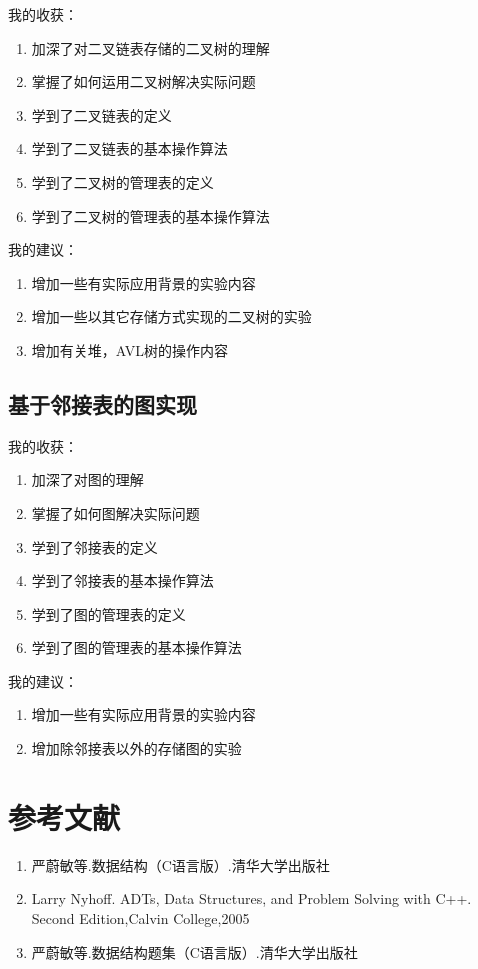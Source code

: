 \documentclass[supercite]{Experimental_Report}
\theoremstyle{definition}
\begin{document}
我的收获：
\begin{enumerate}
	\item 加深了对二叉链表存储的二叉树的理解
    \item 掌握了如何运用二叉树解决实际问题
    \item 学到了二叉链表的定义
    \item 学到了二叉链表的基本操作算法
    \item 学到了二叉树的管理表的定义
    \item 学到了二叉树的管理表的基本操作算法
\end{enumerate}
我的建议：
\begin{enumerate}
	\item 增加一些有实际应用背景的实验内容
    \item 增加一些以其它存储方式实现的二叉树的实验
    \item 增加有关堆，AVL树的操作内容
\end{enumerate}

\subsection{基于邻接表的图实现}

我的收获：
\begin{enumerate}
	\item 加深了对图的理解
    \item 掌握了如何图解决实际问题
    \item 学到了邻接表的定义
    \item 学到了邻接表的基本操作算法
    \item 学到了图的管理表的定义
    \item 学到了图的管理表的基本操作算法
\end{enumerate}
我的建议：
\begin{enumerate}
	\item 增加一些有实际应用背景的实验内容
    \item 增加除邻接表以外的存储图的实验
\end{enumerate}

\newpage
\section{参考文献}
\begin{enumerate}
	\item 严蔚敏等.数据结构（C语言版）.清华大学出版社
    \item Larry Nyhoff. ADTs, Data Structures, and Problem Solving with C++. Second Edition,Calvin College,2005
    \item 严蔚敏等.数据结构题集（C语言版）.清华大学出版社
\end{enumerate}
\newpage
\end{document}

